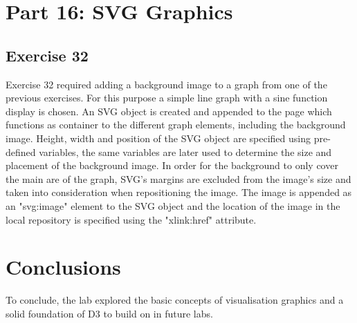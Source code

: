 \documentclass[11pt]{article}   	%
\begin{document}
\section{Part 16: SVG Graphics}
\subsection{ Exercise 32}
\vspace{-1em}

Exercise 32 required adding a background image to a graph from one of the previous exercises. For this purpose a simple line graph with a sine function display is chosen. An SVG object is created and appended to the page which functions as container to the different graph elements, including the background image. Height, width and position of the SVG object are specified using pre-defined variables, the same variables are later used to determine the size and placement of the background image. In order for the background to only cover the main are of the graph, SVG's margins are excluded from the image's size and taken into consideration when repositioning the image. The image is appended as an "svg:image" element to the SVG object and the location of the image in the local repository is specified using the "xlink:href" attribute.     

\section{Conclusions}
To conclude, the lab explored the basic concepts of visualisation graphics and a solid foundation of D3 to build on in future labs.
\end{document}
